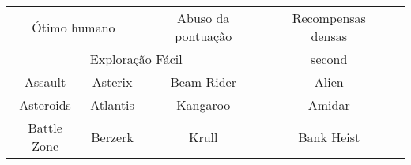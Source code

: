 \begin{tabular}{cc|c||c|c}
    \multicolumn{2}{c|}{Ótimo humano} & Abuso da pontuação & Recompensas densas\\
    \multicolumn{3}{c||}{Exploração Fácil}                      & second \\
    Assault     & Asterix                    & Beam Rider                & Alien                    \\
    Asteroids   & Atlantis                   & Kangaroo                  & Amidar                   \\
    Battle Zone & Berzerk                    & Krull                     & Bank Heist               \\
\end{tabular}
